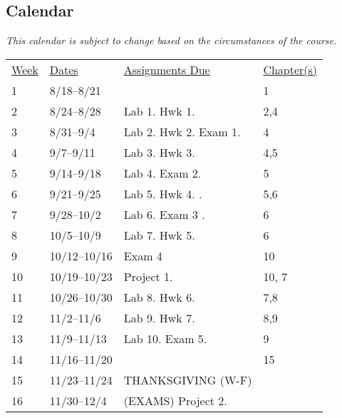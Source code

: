 \documentclass[10pt]{article}
\begin{document}
\subsection{Calendar}

\textit{This calendar is subject to change based on the circumstances of the course.} 

\begin{center}
\begin{tabular}{llll}
\underline{Week} & \underline{Dates} & \underline{Assignments Due} & \underline{Chapter(s)}\\
1 & 8/18--8/21  &  &  1\\
2 & 8/24--8/28 & Lab 1. Hwk 1. & 2,4\\
3 & 8/31--9/4 & Lab 2. Hwk 2. Exam 1.  &  4  \\
4 & 9/7--9/11  & Lab 3. Hwk 3. &   4,5 \\
5 & 9/14--9/18 & Lab 4. Exam 2. & 5\\
6 & 9/21--9/25 & Lab 5. Hwk 4. . & 5,6\\
7 & 9/28--10/2 & Lab 6. Exam 3 . &   6 \\
8 & 10/5--10/9 & Lab 7.  Hwk 5. &  6 \\
9 & 10/12--10/16 & Exam 4 & 10  \\
10 & 10/19--10/23  & Project 1. &  10, 7  \\
11 & 10/26--10/30 &  Lab 8. Hwk 6. &  7,8 \\
12 & 11/2--11/6 &  Lab 9. Hwk 7. & 8,9 \\
13 & 11/9--11/13 & Lab 10. Exam 5.  &  9 \\
14 & 11/16--11/20 &  &  15 \\
15 & 11/23--11/24 & THANKSGIVING (W-F)  &  \\
16 & 11/30--12/4 & (EXAMS) Project 2. &  \\
\end{tabular}
\end{center}
\end{document}
